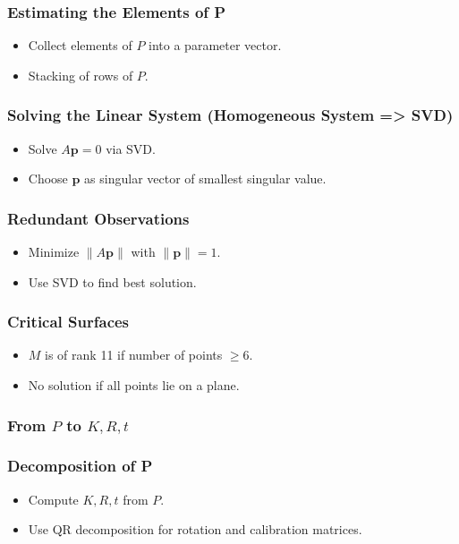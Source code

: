 \begin{frame}
  \frametitle{Estimating the Elements of P}
  \begin{itemize}
    \item Collect elements of $P$ into a parameter vector.
    \item Stacking of rows of $P$.
  \end{itemize}
\end{frame}

\begin{frame}
  \frametitle{Solving the Linear System (Homogeneous System => SVD)}
  \begin{itemize}
    \item Solve $A\mathbf{p}=0$ via SVD.
    \item Choose $\mathbf{p}$ as singular vector of smallest singular value.
  \end{itemize}
\end{frame}

\begin{frame}
  \frametitle{Redundant Observations}
  \begin{itemize}
    \item Minimize $\|A\mathbf{p}\|$ with $\|\mathbf{p}\|=1$.
    \item Use SVD to find best solution.
  \end{itemize}
\end{frame}

\begin{frame}
  \frametitle{Critical Surfaces}
  \begin{itemize}
    \item $M$ is of rank 11 if number of points $\ge 6$.
    \item No solution if all points lie on a plane.
  \end{itemize}
\end{frame}

\begin{frame}
  \frametitle{From $P$ to $K,R,t$}
\end{frame}

\begin{frame}
  \frametitle{Decomposition of P}
  \begin{itemize}
    \item Compute $K, R, t$ from $P$.
    \item Use QR decomposition for rotation and calibration matrices.
  \end{itemize}
\end{frame}

